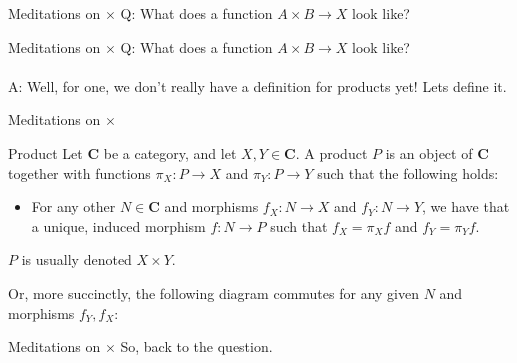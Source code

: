 \documentclass[tikz]{beamer}
\theoremstyle{definition}
\begin{document}
\begin{frame}{Meditations on $\times$}
    Q: What does a function $A \times B \to X$ look like? 
\end{frame}{}

\begin{frame}{Meditations on $\times$}
    Q: What does a function $A \times B \to X$ look like? 
    \\
    \\
    A: Well, for one, we don't really have a definition for products yet! Lets define it. 
\end{frame}{}

\begin{frame}{Meditations on $\times$}
    \begin{definition}{Product}
        Let $\mathbf{C}$ be a category, and let $X, Y \in \mathbf{C}$. A product $P$ is an object of $\mathbf{C}$ together with functions $\pi_X: P \to X$ and $\pi_Y: P \to Y$ such that the following holds:  
            \begin{itemize}
                \item For any other $N \in \mathbf{C}$ and morphisms $f_X: N \to X$ and $f_Y : N \to Y$, we have that a unique, induced morphism $f : N \to P$ such that $f_X = \pi_Xf$ and $f_Y = \pi_Yf$. 
            \end{itemize}
    \end{definition}
    $P$ is usually denoted $X \times Y$.
\end{frame}{}

\begin{frame}[fragile]
    Or, more succinctly, the following diagram commutes for any given $N$ and morphisms $f_Y, f_X$: 
    
\begin{center}
    {}
\end{center}{}

\end{frame}

\begin{frame}{Meditations on $\times$}
    So, back to the question.
\end{frame}{}
\end{document}
